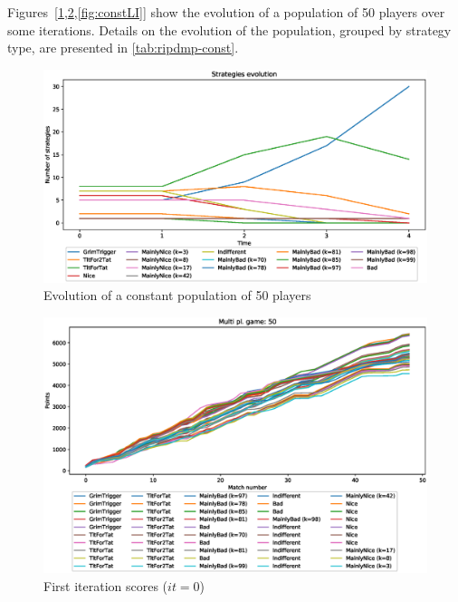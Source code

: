 \documentclass[journal,10pt,twoside]{IEEEtran}
\begin{document}
Figures~[\ref{fig:constR},\ref{fig:constFI},\ref{fig:constLI}] show the evolution of a population of 50 players over some iterations.
Details on the evolution of the population, grouped by strategy type, are presented in \autoref{tab:ripdmp-const}.

\begin{figure}[!ht]
    \centering
    \includegraphics[width=1\columnwidth]{../img/ripdmp-const/ripdmp-evolution-const-pop-50}
    \caption{Evolution of a constant population of 50 players}
    \label{fig:constR}
\end{figure}

\begin{figure}[!ht]
    \centering
    \includegraphics[width=1\columnwidth]{../img/ripdmp-const/ripdmp-scores-const-pop-50-r0}
    \caption{First iteration scores ($it=0$)}
    \label{fig:constFI}
\end{figure}
\end{document}

